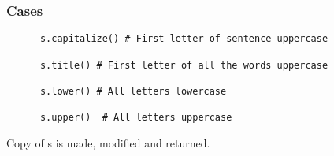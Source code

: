 \begin{frame}[fragile]\frametitle{Cases}
  \begin{lstlisting}
      s.capitalize() # First letter of sentence uppercase

      s.title() # First letter of all the words uppercase

      s.lower() # All letters lowercase

      s.upper()  # All letters uppercase
  \end{lstlisting}
    Copy of s is made, modified and returned.

\end{frame}




